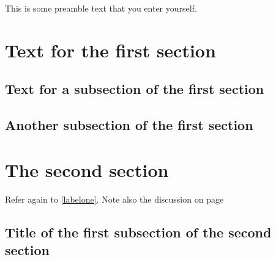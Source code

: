 \documentclass{article}
\begin{document}
This is some  preamble  text  that  you  enter  yourself.

\section{Text  for the  first  section}
\lipsum [1]

\subsection{Text  for a subsection  of the  first  section}
\lipsum [2-3]
\label{labelone}

\subsection{Another  subsection  of the  first  section}
\lipsum [4-5]
\label{labeltwo}

\section{The  second  section}
\lipsum [6]

Refer  again to \ref{labelone}.
Note  also  the  discussion  on page \pageref{labeltwo}

\subsection{Title of the  first  subsection  of the  second  section}
\lipsum [7]
\end{document}
